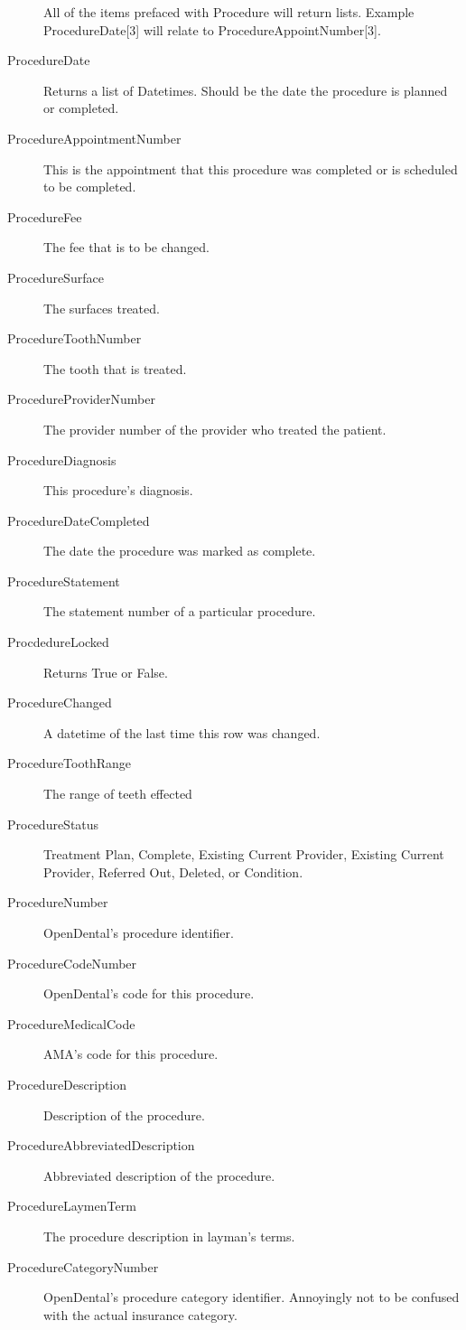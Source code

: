 \documentclass[10pt,a4paper]{article}
\begin{document}
\begin{description}
\begin{center}
All of the items prefaced with Procedure will return lists. Example ProcedureDate[3] will relate to ProcedureAppointNumber[3].
\end{center}

\item[ProcedureDate] Returns a list of Datetimes. Should be the date the procedure is planned or completed.
\item[ProcedureAppointmentNumber] This is the appointment that this procedure was completed or is scheduled to be completed.
\item[ProcedureFee] The fee that is to be changed.
\item[ProcedureSurface] The surfaces treated.
\item[ProcedureToothNumber] The tooth that is treated.
\item[ProcedureProviderNumber] The provider number of the provider who treated the patient.
\item[ProcedureDiagnosis] This procedure's diagnosis.
\item[ProcedureDateCompleted] The date the procedure was marked as complete.
\item[ProcedureStatement] The statement number of a particular procedure.
\item[ProcdedureLocked] Returns True or False.
\item[ProcedureChanged] A datetime of the last time this row was changed.
\item[ProcedureToothRange] The range of teeth effected
\item[ProcedureStatus] Treatment Plan, Complete, Existing Current Provider, Existing Current Provider, Referred Out, Deleted, or Condition.
\item[ProcedureNumber] OpenDental's procedure identifier. 
\item[ProcedureCodeNumber] OpenDental's code for this procedure. 
\item[ProcedureMedicalCode] AMA's code for this procedure.
\item[ProcedureDescription] Description of the procedure.
\item[ProcedureAbbreviatedDescription] Abbreviated description of the procedure.
\item[ProcedureLaymenTerm] The procedure description in layman's terms.
\item[ProcedureCategoryNumber] OpenDental's procedure category identifier. Annoyingly not to be confused with the actual insurance category.
  


\end{description}
\end{document}
